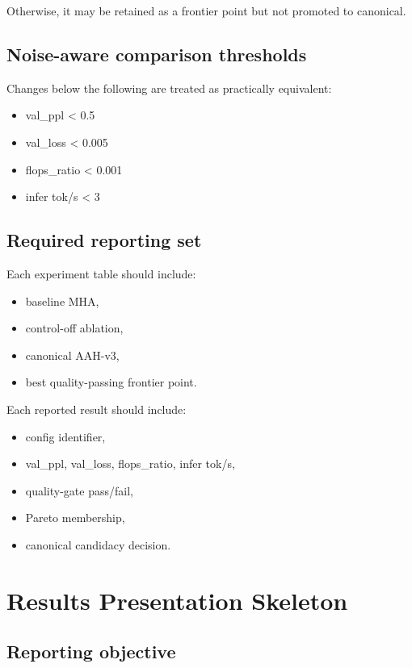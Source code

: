 \documentclass[11pt]{article}
\begin{document}
Otherwise, it may be retained as a frontier point but not promoted to canonical.

\subsection{Noise-aware comparison thresholds}

Changes below the following are treated as practically equivalent:
\begin{itemize}
\item val_ppl < 0.5
\item val_loss < 0.005
\item flops_ratio < 0.001
\item infer tok/s < 3%
\end{itemize}

\subsection{Required reporting set}

Each experiment table should include:
\begin{itemize}
\item baseline MHA,
\item control-off ablation,
\item canonical AAH-v3,
\item best quality-passing frontier point.
\end{itemize}

Each reported result should include:
\begin{itemize}
\item config identifier,
\item val_ppl, val_loss, flops_ratio, infer tok/s,
\item quality-gate pass/fail,
\item Pareto membership,
\item canonical candidacy decision.
\end{itemize}



\section{Results Presentation Skeleton}

\subsection{Reporting objective}
\end{document}
